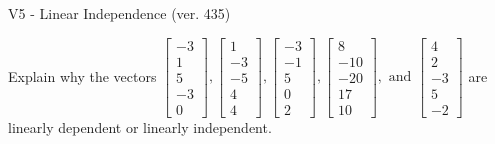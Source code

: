 \begin{exercise}
  \begin{exerciseTitle}V5 - Linear Independence (ver. 435)\end{exerciseTitle}
  \begin{exerciseStatement}
    Explain why the vectors \(\left[\begin{array}{r}
-3 \\
1 \\
5 \\
-3 \\
0
\end{array}\right] , \left[\begin{array}{r}
1 \\
-3 \\
-5 \\
4 \\
4
\end{array}\right] , \left[\begin{array}{r}
-3 \\
-1 \\
5 \\
0 \\
2
\end{array}\right] , \left[\begin{array}{r}
8 \\
-10 \\
-20 \\
17 \\
10
\end{array}\right] , \text{ and } \left[\begin{array}{r}
4 \\
2 \\
-3 \\
5 \\
-2
\end{array}\right]\) are linearly dependent or linearly independent.	



\end{exerciseStatement}
\end{exercise}

